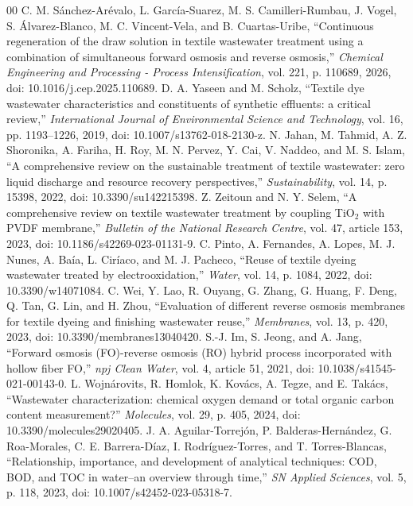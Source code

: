\documentclass[journal, onecolumn, 12pt]{IEEEtran}
\begin{document}
\begin{thebibliography}{00}
 C. M. S\'anchez-Ar\'evalo, L. Garc\'ia-Suarez, M. S. Camilleri-Rumbau, J. Vogel, S. \'Alvarez-Blanco, M. C. Vincent-Vela, and B. Cuartas-Uribe, ``Continuous regeneration of the draw solution in textile wastewater treatment using a combination of simultaneous forward osmosis and reverse osmosis,'' \textit{Chemical Engineering and Processing - Process Intensification}, vol. 221, p. 110689, 2026, doi: 10.1016/j.cep.2025.110689.
 D. A. Yaseen and M. Scholz, ``Textile dye wastewater characteristics and constituents of synthetic effluents: a critical review,'' \textit{International Journal of Environmental Science and Technology}, vol. 16, pp. 1193--1226, 2019, doi: 10.1007/s13762-018-2130-z.
 N. Jahan, M. Tahmid, A. Z. Shoronika, A. Fariha, H. Roy, M. N. Pervez, Y. Cai, V. Naddeo, and M. S. Islam, ``A comprehensive review on the sustainable treatment of textile wastewater: zero liquid discharge and resource recovery perspectives,'' \textit{Sustainability}, vol. 14, p. 15398, 2022, doi: 10.3390/su142215398.
 Z. Zeitoun and N. Y. Selem, ``A comprehensive review on textile wastewater treatment by coupling TiO$_2$ with PVDF membrane,'' \textit{Bulletin of the National Research Centre}, vol. 47, article 153, 2023, doi: 10.1186/s42269-023-01131-9.
 C. Pinto, A. Fernandes, A. Lopes, M. J. Nunes, A. Ba\'ia, L. Cir\'iaco, and M. J. Pacheco, ``Reuse of textile dyeing wastewater treated by electrooxidation,'' \textit{Water}, vol. 14, p. 1084, 2022, doi: 10.3390/w14071084.
 C. Wei, Y. Lao, R. Ouyang, G. Zhang, G. Huang, F. Deng, Q. Tan, G. Lin, and H. Zhou, ``Evaluation of different reverse osmosis membranes for textile dyeing and finishing wastewater reuse,'' \textit{Membranes}, vol. 13, p. 420, 2023, doi: 10.3390/membranes13040420.
 S.-J. Im, S. Jeong, and A. Jang, ``Forward osmosis (FO)-reverse osmosis (RO) hybrid process incorporated with hollow fiber FO,'' \textit{npj Clean Water}, vol. 4, article 51, 2021, doi: 10.1038/s41545-021-00143-0.
 L. Wojn\'arovits, R. Homlok, K. Kov\'acs, A. Tegze, and E. Tak\'acs, ``Wastewater characterization: chemical oxygen demand or total organic carbon content measurement?'' \textit{Molecules}, vol. 29, p. 405, 2024, doi: 10.3390/molecules29020405.
 J. A. Aguilar-Torrej\'on, P. Balderas-Hern\'andez, G. Roa-Morales, C. E. Barrera-D\'iaz, I. Rodr\'iguez-Torres, and T. Torres-Blancas, ``Relationship, importance, and development of analytical techniques: COD, BOD, and TOC in water--an overview through time,'' \textit{SN Applied Sciences}, vol. 5, p. 118, 2023, doi: 10.1007/s42452-023-05318-7.

\end{thebibliography}
\end{document}
